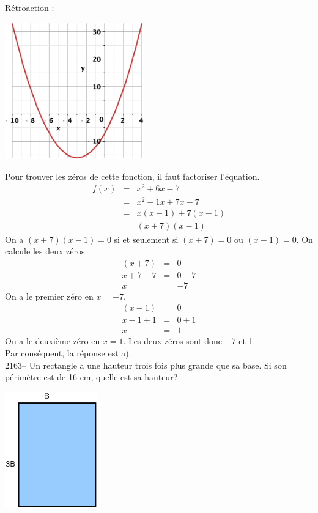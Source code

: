 \documentclass[letterpaper, 12pt]{article}
\begin{document}
R\'etroaction :\\
\begin{center}
 \includegraphics[width=6cm,bb=20 118 575 673]{Q2162.eps}
\end{center}
Pour trouver les z\'eros de cette fonction, il faut factoriser l'\'equation.
\begin{eqnarray*}
 f(x)&=&x^{2}+6x-7\\
&=& x^{2}-1x+7x-7\\
&=& x(x-1)+7(x-1)\\
&=& (x+7)(x-1)
\end{eqnarray*}
On a $(x+7)(x-1) = 0$ si et seulement si $(x+7)=0$ ou $(x-1)=0$. On calcule les deux z\'eros.
 \begin{eqnarray*}
 (x+7)&=&0\\
 x+7-7&=&0-7\\
 x&=&-7
\end{eqnarray*}
On a le premier z\'ero en $x=-7$.
 \begin{eqnarray*}
 (x-1)&=&0\\
 x-1+1&=&0+1\\
 x&=&1
\end{eqnarray*}
On a le deuxi\`eme z\'ero en $x=1$. Les deux z\'eros sont donc $-7$ et 1.\\
Par cons\'equent, la r\'eponse est a).\\

2163-- Un rectangle a une hauteur trois fois plus grande que sa base. Si son p\'erim\`etre est de 16 cm, quelle est sa hauteur? \\
\begin{center}
 \includegraphics[width=4cm,bb=14 14 297 362]{Q2163.eps}
\end{center}
\end{document}
